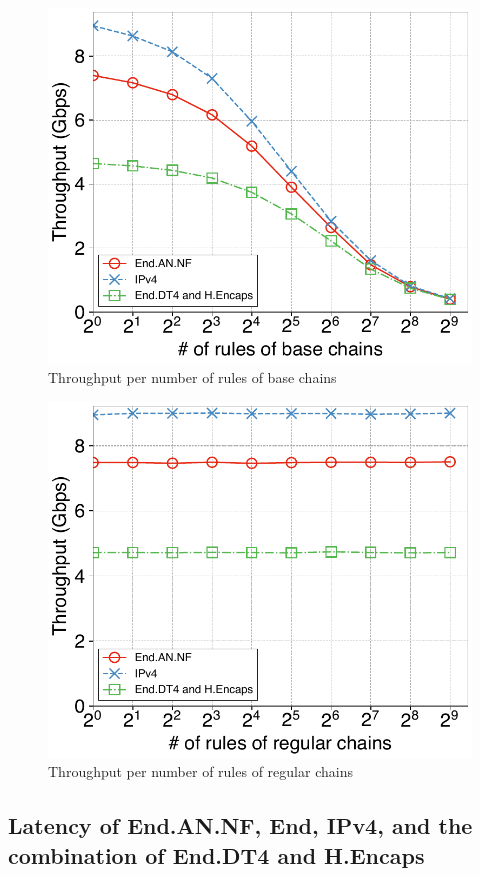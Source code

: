 \begin{figure}[t]
  \centering
  \includegraphics[width=0.95\linewidth]{img/rule-throughput.pdf}
  \caption{Throughput per number of rules of base chains}
  \label{fig:rule-thru}
\end{figure}

\begin{figure}[t]
  \centering
  \includegraphics[width=0.95\linewidth]{img/regular-throughput.pdf}
  \caption{Throughput per number of rules of regular chains}
  \label{fig:reg-thru}
\end{figure}

\subsection{Latency of End.AN.NF, End, IPv4, and the combination of End.DT4 and H.Encaps}
\label{ssec:eval.rtt}


